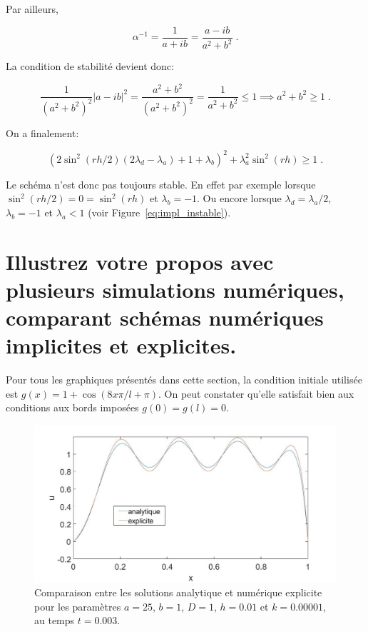 \documentclass[a4paper, 12pt]{report}
\begin{document}
Par ailleurs,

\begin{equation}
\alpha^{-1} = \frac{1}{a+ib} = \frac{a-ib}{a^2+b^2}\;.
\end{equation}

La condition de stabilité devient donc:

\begin{equation}
 \frac{1}{(a^2+b^2)^2}|a-ib|^2 = \frac{a^2+b^2}{(a^2+b^2)^2} = \frac{1}{a^2+b^2}  \le 1 \implies a^2+b^2 \ge 1\;.
\end{equation}

On a finalement:

\begin{equation}
\boxed{\left ( 2 \sin^2(rh/2) (2 \lambda_d - \lambda_a) +1 + \lambda_b \right )^2 + \lambda_a^2 \sin^2(rh) \ge 1}\;.
\end{equation}

Le schéma n'est donc pas toujours stable. En effet par exemple lorsque
$\sin^2(rh/2) = 0 = \sin^2(rh)$ et $\lambda_b = -1$. Ou encore lorsque
$\lambda_d = \lambda_a/2$, $\lambda_b = -1$ et $\lambda_a < 1$ (voir Figure~\ref{eq:impl_instable}).

\section{Illustrez votre propos avec plusieurs simulations numériques, comparant schémas numériques implicites et explicites.}

Pour tous les graphiques présentés dans cette section, la condition initiale
utilisée est $g(x) = 1+\cos(8x \pi /l+ \pi )$. On peut constater qu'elle satisfait
bien aux conditions aux bords imposées $g(0) = g(l) = 0$.

\begin{figure}[H]
  \center
  \includegraphics[scale=0.4]{images/analy_vs_expl_t_end_0dot003.jpg}
  \caption{Comparaison entre les solutions analytique et numérique explicite pour
  les paramètres $a=25$, $b=1$, $D=1$, $h=0.01$ et $k=0.00001$, au temps $t=0.003$.}
  \label{fig:analy_vs_explicite}
\end{figure}
\end{document}
